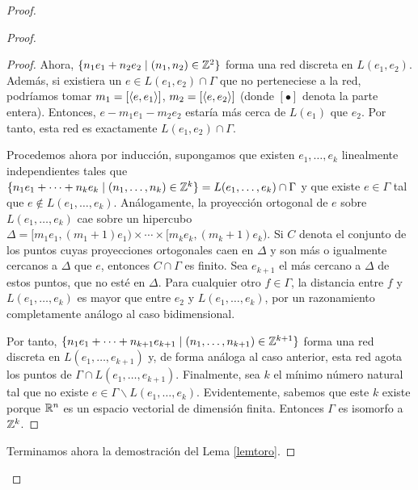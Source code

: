 \begin{proof}
\begin{proof}
\begin{proof}
  Ahora, $\{n_1e_1+n_2e_2 \mid (n_1,n_2) \in \mathbb{Z}^2 \}$ forma una red discreta en $L(e_1,e_2)$. Además, si existiera un $e\in L(e_1,e_2)\cap \Gamma$ que no perteneciese a la red, podríamos tomar $m_1=[\left\langle e,e_1\right\rangle]$, $m_2=[\left\langle e,e_2\right\rangle]$ (donde $[\bullet]$ denota la parte entera). Entonces, $e-m_1e_1-m_2e_2$ estaría más cerca de $L(e_1)$ que $e_2$. Por tanto, esta red es exactamente $L(e_1,e_2) \cap \Gamma$.

      Procedemos ahora por inducción, supongamos que existen $e_1,\dots,e_k$ linealmente independientes tales que $\{n_1e_1+\cdots+n_ke_k \mid (n_1,\dots,n_k) \in \mathbb{Z}^k \} = L(e_1,\dots,e_k) \cap \Gamma$ y que existe $e\in \Gamma$ tal que $e \not\in L(e_1,\dots,e_k)$. Análogamente, la proyección ortogonal de $e$ sobre $L(e_1,\dots,e_k)$ cae sobre un hipercubo $\Delta=[m_1e_1,(m_1+1)e_1) \times \cdots \times [m_ke_k,(m_k+1)e_k)$. Si $C$ denota el conjunto de los puntos cuyas proyecciones ortogonales caen en $\Delta$ y son más o igualmente cercanos a $\Delta$ que $e$, entonces $C \cap \Gamma$ es finito. Sea $e_{k+1}$ el más cercano a $\Delta$ de estos puntos, que no esté en $\Delta$. Para cualquier otro $f \in \Gamma$, la distancia entre $f$ y $L(e_1,\dots,e_k)$ es mayor que entre $e_2$ y $L(e_1,\dots,e_k)$, por un razonamiento completamente análogo al caso bidimensional. 

	Por tanto, $\{n_1e_1+\dots+n_{k+1}e_{k+1} \mid (n_1,\dots,n_{k+1}) \in \mathbb{Z}^{k+1}\}$ forma una red discreta en $L(e_1,\dots,e_{k+1})$ y, de forma análoga al caso anterior, esta red agota los puntos de $\Gamma\cap L(e_1,\dots,e_{k+1})$.
	Finalmente, sea $k$ el mínimo número natural tal que no existe $e \in \Gamma \backslash L(e_1,\dots,e_k)$. Evidentemente, sabemos que este $k$ existe porque $\mathbb{R}^n$ es un espacio vectorial de dimensión finita. Entonces $\Gamma$ es isomorfo a $\mathbb{Z}^k$.
\end{proof}

Terminamos ahora la demostración del Lema \ref{lemtoro}.
 

\end{proof}
\end{proof}
